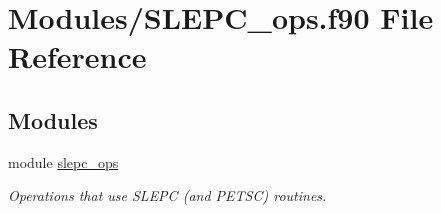 \hypertarget{SLEPC__ops_8f90}{}\section{Modules/\+S\+L\+E\+P\+C\+\_\+ops.f90 File Reference}
\label{SLEPC__ops_8f90}
\subsection*{Modules}
\begin{DoxyCompactItemize}
\item 
module \hyperlink{namespaceslepc__ops}{slepc\+\_\+ops}
\begin{DoxyCompactList}\small\item\em Operations that use S\+L\+E\+PC (and P\+E\+T\+SC) routines. \end{DoxyCompactList}\end{DoxyCompactItemize}
